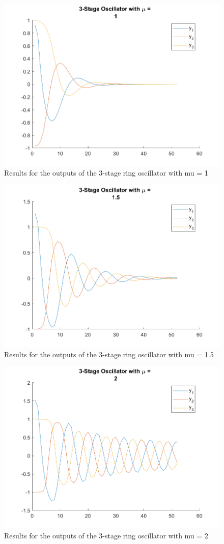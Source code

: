 \documentclass[letter]{article}
\begin{document}
\begin{figure}[p]
	\centering
	\includegraphics[width=0.7\linewidth]{fig/HW6_pblm3_results_mu_1}
	\caption{Results for the outputs of the 3-stage ring oscillator with mu = 1}
	\label{fig:pblm3_mu1}
\end{figure}

\begin{figure}[p]
	\centering
	\includegraphics[width=0.7\linewidth]{fig/HW6_pblm3_results_mu_1.5}
	\caption{Results for the outputs of the 3-stage ring oscillator with mu = 1.5}
	\label{fig:pblm3_mu15}
\end{figure}

\begin{figure}[p]
	\centering
	\includegraphics[width=0.7\linewidth]{fig/HW6_pblm3_results_mu_2}
	\caption{Results for the outputs of the 3-stage ring oscillator with mu = 2}
	\label{fig:pblm3_mu2}
\end{figure}
\end{document}
